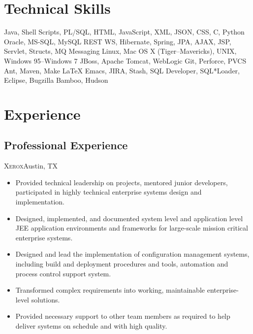 \documentclass[11pt,letterpaper,sans]{moderncv}
\begin{document}
\section{Technical Skills}
         {Java, Shell Scripts, PL/SQL, HTML, JavaScript, XML, JSON, CSS, 
         C, Python}
         {Oracle, MS-SQL, MySQL}
         {REST WS, Hibernate, Spring, JPA, AJAX, JSP, Servlet, Structs, 
         MQ Messaging}
         {Linux, Mac OS X (Tiger--Mavericks), UNIX, Windows 95--Windows 7}
         {JBoss, Apache Tomcat, WebLogic}
         {Git, Perforce, PVCS}
         {Ant, Maven, Make}
         {\LaTeX}
         {Emacs, JIRA, Stash, SQL Developer, SQL*Loader, Eclipse, Bugzilla}
         {Bamboo, Hudson}



\section{Experience}

  \subsection{Professional Experience}
     {\textsc{Xerox}}{Austin, TX}{}
     {\begin{itemize}
         \item Provided technical leadership on projects, mentored junior 
               developers, participated in highly technical enterprise 
               systems design and implementation.
         \item Designed, implemented, and documented system level and 
               application level JEE application environments and frameworks 
               for large-scale mission critical enterprise systems.
         \item Designed and lead the implementation of configuration 
               management systems, including build and deployment procedures 
               and tools, automation and process control support system.
         \item Transformed complex requirements into working, maintainable 
               enterprise-level solutions.
         \item Provided necessary support to other team members as required 
               to help deliver systems on schedule and with high quality.
     \end{itemize}}
      
\end{document}
